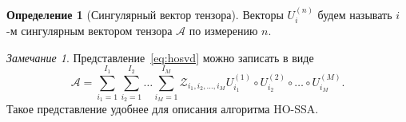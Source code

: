 \documentclass[specialist,
    substylefile = spbu_report.rtx,
    subf,href,colorlinks=true, 12pt]{disser}
\theoremstyle{plain}
\theoremstyle{definition}
\newtheorem{definition}{Определение}[section]
\theoremstyle{remark}
\newtheorem*{remark}{Замечание}
\begin{document}
    \begin{definition}[Сингулярный вектор тензора]
        \label{def:singular-tensor}
        Векторы $U_i^{(n)}$ будем называть $i$-м сингулярным вектором тензора $\mathcal A$ по измерению $n$.
    \end{definition}
    \begin{remark}
        Представление~\eqref{eq:hosvd} можно записать в виде
        \begin{equation}
            \mathcal{A}=\sum_{i_1=1}^{I_1} \sum_{i_2=1}^{I_2}\ldots \sum_{i_M=1}^{I_M} \mathcal{Z}_{i_1,i_2,\ldots,i_M}
            U^{(1)}_{i_1} \circ U^{(2)}_{i_2} \circ \ldots\circ U^{(M)}_{i_M}.\label{eq:sum-hosvd}
        \end{equation}
        Такое представление удобнее для описания алгоритма HO-SSA\@.
    \end{remark}
\end{document}
